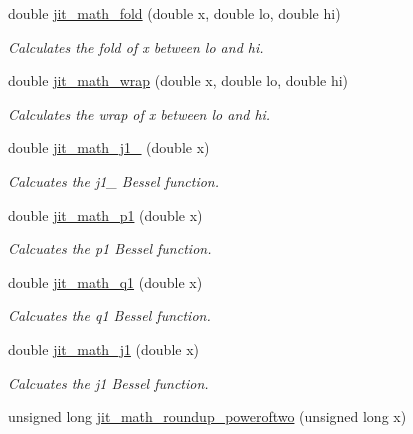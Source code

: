 \begin{DoxyCompactItemize}
double \hyperlink{group__mathmod_ga2187a488437b8bf2754eb096c032f85c}{jit\_\-math\_\-fold} (double x, double lo, double hi)
\begin{DoxyCompactList}\small\item\em Calculates the fold of x between lo and hi. \item\end{DoxyCompactList}\item 
double \hyperlink{group__mathmod_ga04d9298473bc92c34c7f1e5e6154c3d1}{jit\_\-math\_\-wrap} (double x, double lo, double hi)
\begin{DoxyCompactList}\small\item\em Calculates the wrap of x between lo and hi. \item\end{DoxyCompactList}\item 
double \hyperlink{group__mathmod_ga1457496cc4e0df7453df7e5c9eaf4fc9}{jit\_\-math\_\-j1\_} (double x)
\begin{DoxyCompactList}\small\item\em Calcuates the j1\_ Bessel function. \item\end{DoxyCompactList}\item 
double \hyperlink{group__mathmod_ga8cbec53c20ed586044eac91540c7432e}{jit\_\-math\_\-p1} (double x)
\begin{DoxyCompactList}\small\item\em Calcuates the p1 Bessel function. \item\end{DoxyCompactList}\item 
double \hyperlink{group__mathmod_ga3c3fe23905fbc9b6899c00f2fdaab1df}{jit\_\-math\_\-q1} (double x)
\begin{DoxyCompactList}\small\item\em Calcuates the q1 Bessel function. \item\end{DoxyCompactList}\item 
double \hyperlink{group__mathmod_ga29954144d25b2c4793fd1a78d8bff5e8}{jit\_\-math\_\-j1} (double x)
\begin{DoxyCompactList}\small\item\em Calcuates the j1 Bessel function. \item\end{DoxyCompactList}\item 
unsigned long \hyperlink{group__mathmod_ga00cb634371131410e9f89ccc7f27c6d2}{jit\_\-math\_\-roundup\_\-poweroftwo} (unsigned long x)

\end{DoxyCompactItemize}
